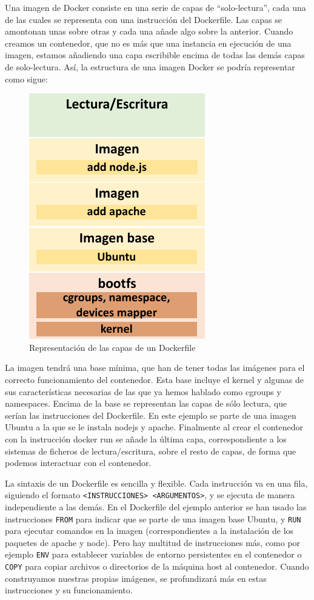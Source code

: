 	Una imagen de Docker consiste en una serie de capas de “solo-lectura”, cada una de las cuales se representa con una instrucción del Dockerfile. Las capas se amontonan unas sobre otras y cada una añade algo sobre la anterior. Cuando creamos un contenedor, que no es más que una instancia en ejecución de una imagen, estamos añadiendo una capa escribible encima de todas las demás capas de solo-lectura. Así, la estructura de una imagen Docker se podría representar como sigue: \\ 

	\begin{figure}[h]
	\centering
	\includegraphics[width=0.3 \textwidth]{../imgs/EdA/dockerfile2.png}
	\caption{Representación de las capas de un Dockerfile}
	\label{fig:dockerfile-layers}
	\end{figure}

	La imagen tendrá una base mínima, que han de tener todas las imágenes para el correcto funcionamiento del contenedor. Esta base incluye el kernel y algunas de sus características necesarias de las que ya hemos hablado como cgroups y namespaces. Encima de la base se representan las capas de sólo lectura, que serían las instrucciones del Dockerfile. En este ejemplo se parte de una imagen Ubuntu a la que se le instala nodejs y apache. Finalmente al crear el contenedor con la instrucción docker run se añade la última capa, correspondiente a los sistemas de ficheros de lectura/escritura, sobre el resto de capas, de forma que podemos interactuar con el contenedor.

	La sintaxis de un Dockerfile es sencilla y flexible. Cada instrucción va en una fila, siguiendo el formato \texttt{<INSTRUCCIONES> <ARGUMENTOS>}, y se ejecuta de manera independiente a las demás. En el Dockerfile del ejemplo anterior se han usado las instrucciones \texttt{FROM} para indicar que se parte de una imagen base Ubuntu, y \texttt{RUN} para ejecutar comandos en la imagen (correspondientes a la instalación de los paquetes de apache y node). Pero hay multitud de instrucciones más, como por ejemplo \texttt{ENV} para establecer variables de entorno persistentes en el contenedor o \texttt{COPY} para copiar archivos o directorios de la máquina host al contenedor. Cuando construyamos nuestras propias imágenes, se profundizará más en estas instrucciones y su funcionamiento.

